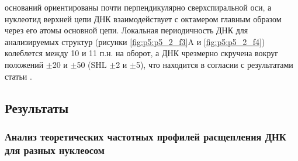 оснований ориентированы почти перпендикулярно сверхспиральной оси, а нуклеотид верхней цепи ДНК взаимодействует с октамером главным образом через его атомы основной цепи. Локальная периодичность ДНК для анализируемых структур (рисунки \ref{fig:p5:p5_2_f3}A и \ref{fig:p5:p5_2_f4}) колеблется между 10 и 11 п.н. на оборот, а ДНК чрезмерно скручена вокруг положений $\pm$20 и $\pm$50 (SHL $\pm$2 и $\pm$5), что находится в согласии с результатами статьи \cite{tan_nucleosome_2011}.


\subsection{Результаты}
\subsubsection{Анализ теоретических частотных профилей расщепления ДНК для разных нуклеосом}
